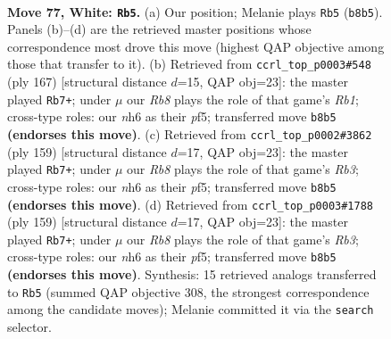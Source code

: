 \documentclass[11pt]{article}
\begin{document}
\clearpage

\begin{figure}[p]\centering
\begin{subfigure}{0.46\textwidth}\centering
\resizebox{\linewidth}{!}{%
\newchessgame
\chessboard[
  setfen={1R6/3k4/7n/8/p6r/P6p/7K/8 w - - 12 77},
  showmover=false,
  pgfstyle=straightmove, color=movearrow, markmove={b8-b5}
]}
\caption{}
\end{subfigure}\hfill
\begin{subfigure}{0.46\textwidth}\centering
\resizebox{\linewidth}{!}{%
\newchessgame
\chessboard[
  setfen={1r6/4K2k/7P/5P1R/8/8/8/8 b - - 26 84},
  showmover=false,
  pgfstyle=straightmove, color=movearrow, markmove={b8-b7}
]}
\caption{}
\end{subfigure}
\\[4pt]
\begin{subfigure}{0.46\textwidth}\centering
\resizebox{\linewidth}{!}{%
\newchessgame
\chessboard[
  setfen={8/4K2k/1r5P/5P1R/8/8/8/8 b - - 22 80},
  showmover=false,
  pgfstyle=straightmove, color=movearrow, markmove={b6-b7}
]}
\caption{}
\end{subfigure}\hfill
\begin{subfigure}{0.46\textwidth}\centering
\resizebox{\linewidth}{!}{%
\newchessgame
\chessboard[
  setfen={8/4K2k/1r5P/5P1R/8/8/8/8 b - - 42 80},
  showmover=false,
  pgfstyle=straightmove, color=movearrow, markmove={b6-b7}
]}
\caption{}
\end{subfigure}
\caption{\textbf{Move 77, White: \texttt{Rb5}.} (a) Our position; Melanie plays \texttt{Rb5} (\texttt{b8b5}). Panels (b)--(d) are the retrieved master positions whose correspondence most drove this move (highest QAP objective among those that transfer to it). (b) Retrieved from \texttt{ccrl\_top\_p0003\#548} (ply 167) [structural distance $d$=15, QAP obj=23]: the master played \texttt{Rb7+}; under $\mu$ our \emph{Rb8} plays the role of that game's \emph{Rb1}; cross-type roles: our \emph{n}h6 as their \emph{p}f5; transferred move \texttt{b8b5} \textbf{(endorses this move)}. (c) Retrieved from \texttt{ccrl\_top\_p0002\#3862} (ply 159) [structural distance $d$=17, QAP obj=23]: the master played \texttt{Rb7+}; under $\mu$ our \emph{Rb8} plays the role of that game's \emph{Rb3}; cross-type roles: our \emph{n}h6 as their \emph{p}f5; transferred move \texttt{b8b5} \textbf{(endorses this move)}. (d) Retrieved from \texttt{ccrl\_top\_p0003\#1788} (ply 159) [structural distance $d$=17, QAP obj=23]: the master played \texttt{Rb7+}; under $\mu$ our \emph{Rb8} plays the role of that game's \emph{Rb3}; cross-type roles: our \emph{n}h6 as their \emph{p}f5; transferred move \texttt{b8b5} \textbf{(endorses this move)}. Synthesis: 15 retrieved analogs transferred to \texttt{Rb5} (summed QAP objective 308, the strongest correspondence among the candidate moves); Melanie committed it via the \texttt{search} selector.}
\label{fig:thought-m152}
\end{figure}
\end{document}

